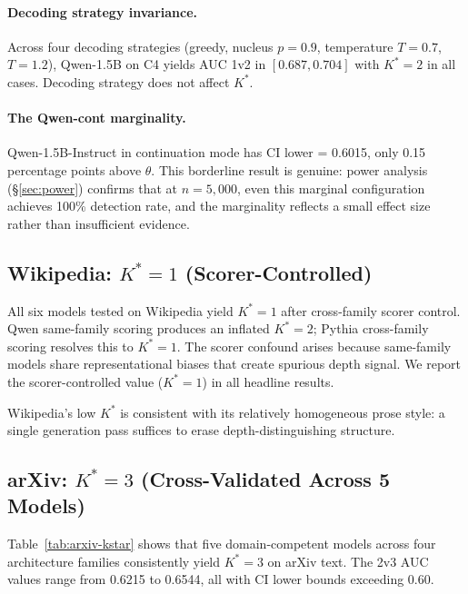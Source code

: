 \documentclass[11pt]{article}
\begin{document}
\paragraph{Decoding strategy invariance.} Across four decoding strategies (greedy, nucleus $p{=}0.9$, temperature $T{=}0.7$, $T{=}1.2$), Qwen-1.5B on C4 yields AUC 1v2 in $[0.687, 0.704]$ with $K^*{=}2$ in all cases. Decoding strategy does not affect $K^*$.

\paragraph{The Qwen-cont marginality.} Qwen-1.5B-Instruct in continuation mode has CI lower = 0.6015, only 0.15 percentage points above $\theta$. This borderline result is genuine: power analysis (\S\ref{sec:power}) confirms that at $n{=}5{,}000$, even this marginal configuration achieves 100\% detection rate, and the marginality reflects a small effect size rather than insufficient evidence.

\subsection{Wikipedia: $K^*{=}1$ (Scorer-Controlled)}

All six models tested on Wikipedia yield $K^*{=}1$ after cross-family scorer control. Qwen same-family scoring produces an inflated $K^*{=}2$; Pythia cross-family scoring resolves this to $K^*{=}1$. The scorer confound arises because same-family models share representational biases that create spurious depth signal. We report the scorer-controlled value ($K^*{=}1$) in all headline results.

Wikipedia's low $K^*$ is consistent with its relatively homogeneous prose style: a single generation pass suffices to erase depth-distinguishing structure.

\subsection{arXiv: $K^*{=}3$ (Cross-Validated Across 5 Models)}

Table~\ref{tab:arxiv-kstar} shows that five domain-competent models across four architecture families consistently yield $K^*{=}3$ on arXiv text. The 2v3 AUC values range from 0.6215 to 0.6544, all with CI lower bounds exceeding 0.60.
\end{document}
